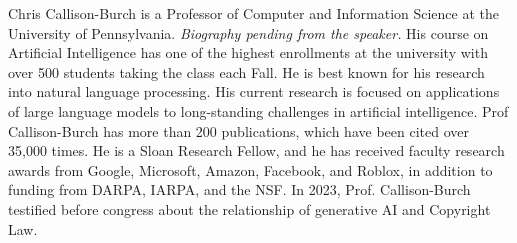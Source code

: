 Chris Callison-Burch is a Professor of Computer and Information Science at the
University of Pennsylvania. \emph{Biography pending from the speaker.}
His course on Artificial Intelligence has one of the highest enrollments at the university with over 500 students taking the class each Fall.
He is best known for his research into natural language processing. His current research is focused on applications of large language models to long-standing challenges in artificial intelligence.
Prof Callison-Burch has more than 200 publications, which have been cited over 35,000 times. He is a Sloan Research Fellow, and he has received faculty research awards from Google, Microsoft, Amazon, Facebook, and Roblox, in addition to funding from DARPA, IARPA, and the NSF.
In 2023, Prof. Callison-Burch testified before congress about the relationship of generative AI and Copyright Law.
